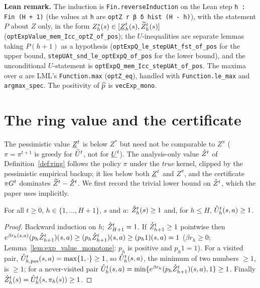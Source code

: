 \textbf{Lean remark.} The induction is \texttt{Fin.reverseInduction} on the Lean step
\texttt{h : Fin (H + 1)} (the values at \texttt{h} are \texttt{optZ r β δ hist (H - h)}), with the statement $P$
about $Z$ only, in the form $Z^*_h(s) \in [\underline{Z}^t_h(s), \widetilde{Z}^t_h(s)]$
(\texttt{optExpValue\_mem\_Icc\_optZ\_of\_pos}); the $U$-inequalities are separate lemmas taking
$P(h+1)$ as a hypothesis (\texttt{optExpQ\_le\_stepUAt\_fst\_of\_pos} for the upper bound,
\texttt{stepUAt\_snd\_le\_optExpQ\_of\_pos} for the lower bound), and the unconditional $U$-statement
is \texttt{optExpQ\_mem\_Icc\_stepUAt\_of\_pos}. The maxima over $a$ are LML's \texttt{Function.max}
(\texttt{optZ\_eq}), handled with \texttt{Function.le\_max} and \texttt{argmax\_spec}. The positivity of
$\widehat{p}$ is \texttt{vecExp\_mono}.

\section{The ring value and the certificate}
\label{sec:pos_certificate}

The pessimistic value $\underline{Z}^t$ is below $Z^*$ but need not be comparable to $Z^{\pi}$
($\pi = \pi^{t+1}$ is greedy for $\widetilde{U}^t$, not for $\underline{U}^t$). The analysis-only value $\mathring{Z}^t$ of
Definition~\ref{def:ring} follows the policy $\pi$ under the \emph{true} kernel, clipped by the
pessimistic empirical backup; it lies below both $\underline{Z}^t$ and $Z^\pi$, and the certificate
$\pi G^t$ dominates $\widetilde{Z}^t - \mathring{Z}^t$. We first record the trivial lower bound on $\mathring{Z}^t$,
which the paper uses implicitly.

\begin{lemma}\label{lem:pos_ring_range}
\leanok
{}
For all $t \ge 0$, $h \in \{1, \dots, H + 1\}$, $s$ and $a$: $\mathring{Z}_h^t(s) \ge 1$ and, for $h \le H$,
$\mathring{U}_h^t(s,a) \ge 1$.
\end{lemma}

\begin{proof}
\leanok
Backward induction on $h$; $\mathring{Z}_{H+1}^t = 1$. If $\mathring{Z}_{h+1}^t \ge 1$ pointwise then
$e^{\beta r_h(s,a)}(p_h\mathring{Z}^t_{h+1})(s,a) \ge (p_h \mathring{Z}^t_{h+1})(s,a) \ge (p_h 1)(s,a) = 1$ ($\beta r_h \ge 0$;
Lemma~\ref{lem:exp_value_monotone}: $p_h$ is positive and $p_h 1 = 1$). For a visited pair,
$\mathring{U}^t_{h,\mathrm{pes}}(s,a) = \max\{1, \cdot\} \ge 1$, so $\mathring{U}_h^t(s,a)$, the minimum of two numbers
$\ge 1$, is $\ge 1$; for a never-visited pair $\mathring{U}_h^t(s,a) = \min\{e^{\beta r_h}(p_h\mathring{Z}^t_{h+1})(s,a), 1\} \ge 1$.
Finally $\mathring{Z}_h^t(s) = \mathring{U}_h^t(s, \pi_h(s)) \ge 1$.
\end{proof}

